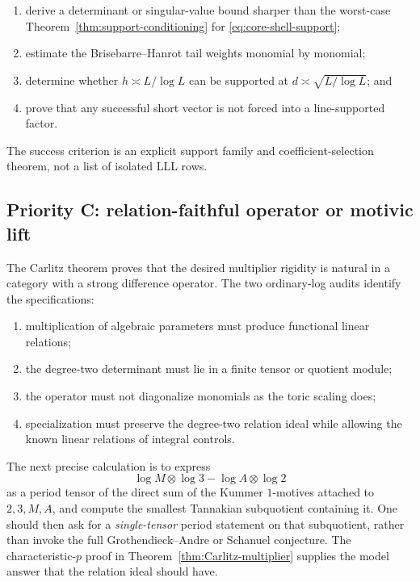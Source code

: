 \documentclass[11pt,oneside]{article}
\theoremstyle{definition}
\theoremstyle{remark}
\begin{document}
\begin{enumerate}
\item derive a determinant or singular-value bound sharper than the worst-case
Theorem~\ref{thm:support-conditioning} for \eqref{eq:core-shell-support};
\item estimate the Brisebarre--Hanrot tail weights monomial by monomial;
\item determine whether $h\asymp L/\log L$ can be supported at
$d\asymp\sqrt{L/\log L}$; and
\item prove that any successful short vector is not forced into a line-supported factor.
\end{enumerate}

The success criterion is an explicit support family and coefficient-selection theorem, not a list
of isolated LLL rows.

\subsection{Priority C: relation-faithful operator or motivic lift}

The Carlitz theorem proves that the desired multiplier rigidity is natural in a category with a
strong difference operator.  The two ordinary-log audits identify the specifications:

\begin{enumerate}
\item multiplication of algebraic parameters must produce functional linear relations;
\item the degree-two determinant must lie in a finite tensor or quotient module;
\item the operator must not diagonalize monomials as the toric scaling does;
\item specialization must preserve the degree-two relation ideal while allowing the known linear
relations of integral controls.
\end{enumerate}

The next precise calculation is to express
\[
  \log M\otimes\log3-\log A\otimes\log2
\]
as a period tensor of the direct sum of the Kummer $1$-motives attached to
$2,3,M,A$, and compute the smallest Tannakian subquotient containing it.  One should then ask for a
\emph{single-tensor} period statement on that subquotient, rather than invoke the full
Grothendieck--Andre or Schanuel conjecture.  The characteristic-$p$ proof in
Theorem~\ref{thm:Carlitz-multiplier} supplies the model answer that the relation ideal should have.
\end{document}
